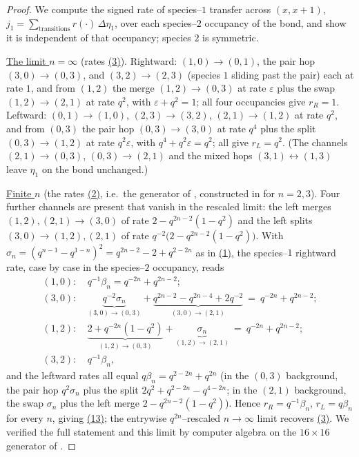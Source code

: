 \documentclass[11pt]{article}
\theoremstyle{plain}
\theoremstyle{definition}
\theoremstyle{remark}
\newcommand{\eps}{\varepsilon}\newcommand{\Exp}{\mathrm{Exp}}
\begin{document}
\begin{proof}
We compute the signed rate of species--$1$ transfer across $(x,x{+}1)$,
$j_1=\sum_{\text{transitions}}r(\cdot)\,\Delta\eta_1$, over each species--$2$ occupancy
of the bond, and show it is independent of that occupancy; species $2$ is symmetric.

\underline{The limit $n=\infty$} \textup{(}rates \hyperref[eq_rates]{(3)}\textup{)}. Rightward:
$(1,0)\!\to\!(0,1)$, the pair hop $(3,0)\!\to\!(0,3)$, and $(3,2)\!\to\!(2,3)$ (species
$1$ sliding past the pair) each at rate $1$, and from $(1,2)$ the merge
$(1,2)\!\to\!(0,3)$ at rate $\eps$ plus the swap $(1,2)\!\to\!(2,1)$ at rate $q^2$, with
$\eps+q^2=1$; all four occupancies give $r_R=1$. Leftward: $(0,1)\!\to\!(1,0)$,
$(2,3)\!\to\!(3,2)$, $(2,1)\!\to\!(1,2)$ at rate $q^2$, and from $(0,3)$ the pair hop
$(0,3)\!\to\!(3,0)$ at rate $q^4$ plus the split $(0,3)\!\to\!(1,2)$ at rate $q^2\eps$,
with $q^4+q^2\eps=q^2$; all give $r_L=q^2$. (The channels $(2,1)\!\to\!(0,3)$,
$(0,3)\!\to\!(2,1)$ and the mixed hops $(3,1)\!\leftrightarrow\!(1,3)$ leave $\eta_1$ on
the bond unchanged.)

\underline{Finite $n$} \textup{(}the rates \hyperref[eq_nrates]{(2)}, i.e.\ the generator of
\cite[\S2.1]{REU}, constructed in
\cite{KLLPZ} for $n=2,3$\textup{)}. Four further channels are present that vanish in the
rescaled limit: the left merges $(1,2),(2,1)\to(3,0)$ of rate $2-q^{2n-2}(1-q^2)$ and
the left splits $(3,0)\to(1,2),(2,1)$ of rate $q^{-2}\big(2-q^{2n-2}(1-q^2)\big)$. With
$\sigma_n=(q^{n-1}-q^{1-n})^2=q^{2n-2}-2+q^{2-2n}$ as in \hyperref[eq_nparams]{(1)}, the
species--$1$ rightward rate,
case by case in the species--$2$ occupancy, reads
\begin{align*}
  (1,0)\colon&\ q^{-1}\beta_n=q^{-2n}+q^{2n-2};\\
  (3,0)\colon&\ \underbrace{q^{-2}\sigma_n}_{(3,0)\to(0,3)}
    +\underbrace{q^{2n-2}-q^{2n-4}+2q^{-2}}_{(3,0)\to(2,1)}\ =\ q^{-2n}+q^{2n-2};\\
  (1,2)\colon&\ \underbrace{2+q^{-2n}(1-q^2)}_{(1,2)\to(0,3)}
    +\underbrace{\sigma_n}_{(1,2)\to(2,1)}\ =\ q^{-2n}+q^{2n-2};\\
  (3,2)\colon&\ q^{-1}\beta_n,
\end{align*}
and the leftward rates all equal $q\beta_n=q^{2-2n}+q^{2n}$ (in the $(0,3)$ background,
the pair hop $q^2\sigma_n$ plus the split $2q^2+q^{2-2n}-q^{4-2n}$; in the $(2,1)$
background, the swap $\sigma_n$ plus the left merge $2-q^{2n-2}(1-q^2)$). Hence
$r_R=q^{-1}\beta_n$, $r_L=q\beta_n$ for every $n$, giving \hyperref[eq_jdecouple]{(13)}; the
entrywise $q^{2n}$--rescaled $n\to\infty$ limit recovers \hyperref[eq_rates]{(3)}. We verified
the full statement and this limit by computer algebra on the $16\times16$ generator of
\cite[\S2.1]{REU}.


\end{proof}
\end{document}
